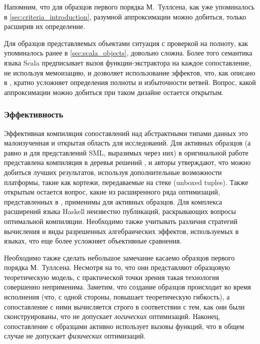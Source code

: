 Напомним, что для образцов первого порядка М.~Туллсена, как уже упоминалось в \ref{sec:criteria_introduction}, разумной аппроксимации можно добиться, только расширив их определение.

Для образцов представляемых объектами \cite{emir2007objects} ситуация с проверкой на полноту, как упоминалось ранее в \ref{sec:scala_objects}, довольно сложна. Более того семантика языка Scala предписывает вызов функции-экстрактора на каждое сопоставление, не используя мемоизацию, и дозволяет использование эффектов, что, как описано в \cite{okasaki98views}, кратно усложняет определения полноты и избыточности ветвей. Вопрос, какой аппроксимации можно добиться при таком дизайне остается открытым.

\subsubsection{Эффективность}

Эффективная компиляция сопоставлений над абстрактными типами данных это малоизученная и открытая область для исследований. Для активных образцов (а равно и для представлений SML, выразимых через них) в оригинальной работе \cite{syme2007extensible} представлена компиляция в деревья решений \cite{scott2000whendo}, и авторы утверждают, что можно добиться лучших результатов, используя дополнительные возможности платформы, такие как кортежи, передаваемые на стеке (unboxed tuples). Также открытым остается вопрос, какие из расширенного ряда оптимизаций, представленных в \cite{maranget2008decisiontrees}, применимы для активных образцов. Для комплекса расширений языка Haskell неизвестно публикаций, раскрывающих вопросы оптимальной компиляции. Необходимо также учитывать различия стратегий вычисления и виды разрешенных алгебраических эффектов, используемых в языках, что еще более усложняет объективные сравнения.

Необходимо также сделать небольшое замечание касаемо образцов первого порядка М.~Туллсена. Несмотря на то, что они представляют образцовую теоретическую модель, с практической точки зрения такая технология совершенно неприменима. Заметим, что создание образцов происходит во время исполнения (что, с одной стороны, повышает теоретическую гибкость), а сопоставление с ними вычисляется строго в соответствии с тем, как они были сконструированы, что не допускает \textit{логических} оптимизаций. Наконец, сопоставление с образцами активно использует вызовы функций, что в общем случае не допускает \textit{физических} оптимизаций. 

